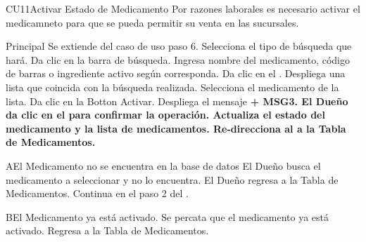 \begin{UseCase}{CU11}{Activar Estado de Medicamento}{
		Por razones laborales es necesario activar el medicamneto para que se pueda permitir su venta en las sucursales.
	}
	\end{UseCase}
	\begin{UCtrayectoria}{Principal}
		\UCpaso Se extiende del caso de uso  paso 6.
		\UCpaso[\UCactor] Selecciona el tipo de búsqueda que hará.
		\UCpaso[\UCactor] Da clic en la barra de búsqueda.
		\UCpaso [\UCactor] Ingresa nombre del medicamento, código de barras o ingrediente activo según corresponda. 
		\UCpaso[\UCactor] Da clic en el .
		\UCpaso Despliega una lista que coincida con la búsqueda realizada. 
		\UCpaso[\UCactor] Selecciona el medicamento de la lista.
		\UCpaso[\UCactor] Da clic en la  {Botton Activar}.
		\UCpaso Despliega el mensaje \bf {+ MSG3}.
		\UCpaso[\UCactor] El Dueño da clic en el  para confirmar la operación.
		\UCpaso Actualiza el estado del medicamento y la lista de medicamentos.
		\UCpaso Re-direcciona al \UCactor a la  {Tabla de Medicamentos}.
	
	\end{UCtrayectoria}


		\begin{UCtrayectoriaA}{A}{El Medicamento no se encuentra en la base de datos}
			\UCpaso[\UCactor] El Dueño busca el medicamento a seleccionar y no lo encuentra.
			\UCpaso[\UCactor] El Dueño regresa a la  {Tabla de Medicamentos}.
			\UCpaso Continua en el paso 2 del .
		\end{UCtrayectoriaA}
		
		
		\begin{UCtrayectoriaA}{B}{El Medicamento ya está activado}.
			\UCpaso[\UCactor] Se percata que el medicamento ya está activado.
			\UCpaso[\UCactor] Regresa a la  {Tabla de Medicamentos}.
		\end{UCtrayectoriaA}

